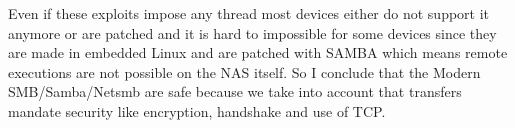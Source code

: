 \documentclass[12pt, letterpaper]{article}
\begin{document}
\hfill\break
Even if these exploits impose any thread most devices either do not support it anymore or are patched and it is hard to impossible for some devices since they are made in embedded Linux and are patched with SAMBA which means remote executions are not possible on the NAS itself. So I conclude that the Modern SMB/Samba/Netsmb are safe because we take into account that transfers mandate security like encryption, handshake and use of TCP.
\end{document}
